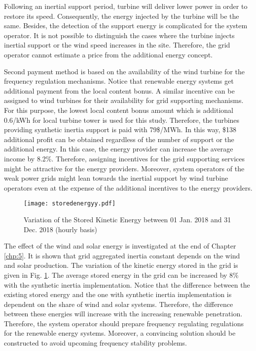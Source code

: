 Following an inertial support period, turbine will deliver lower power in order to restore its speed. Consequently, the energy injected by the turbine will be the same. Besides, the detection of the support energy is complicated for the system operator. It is not possible to distinguish the cases where the turbine injects inertial support or the wind speed increases in the site. Therefore, the grid operator cannot estimate a price from the additional energy concept.\par
\newpage
Second payment method is based on the availability of the wind turbine for the frequency regulation mechanisms. Notice that renewable energy systems get additional payment from the local content bonus. A similar incentive can be assigned to wind turbines for their availability for grid supporting mechanisms. For this purpose, the lowest local content bonus amount which is additional 0.6\cent/kWh for local turbine tower is used for this study. Therefore, the turbines providing synthetic inertia support is paid with 79\$/MWh. In this way, \$138 additional profit can be obtained regardless of the number of support or the additional energy. In this case, the energy provider can increase the average income by 8.2\%. Therefore, assigning incentives for the grid supporting services might be attractive for the energy providers. Moreover, system operators of the weak power grids might lean towards the inertial support by wind turbine operators even at the expense of the additional incentives to the energy providers.\par 
\begin{figure}[h!]
	\centering
	\texttt{[image: storedenergyy.pdf]}
	\caption{Variation of the Stored Kinetic Energy between 01 Jan. 2018 and 31 Dec. 2018 (hourly basis)}
	\label{gridstored}
\end{figure}
\newpage
The effect of the wind and solar energy is investigated at the end of Chapter \ref{chp:5}. It is shown that grid aggregated inertia constant depends on the wind and solar production. The variation of the kinetic energy stored in the grid is given in Fig. \ref{gridstored}. The average stored energy in the grid can be increased by 8\% with the synthetic inertia implementation. Notice that the difference between the existing stored energy and the one with synthetic inertia implementation is dependent on the share of wind and solar systems. Therefore, the difference between these energies will increase with the increasing renewable penetration. Therefore, the system operator should prepare frequency regulating regulations for the renewable energy systems. Moreover, a convincing solution should be constructed to avoid upcoming frequency stability problems. 
\newpage
